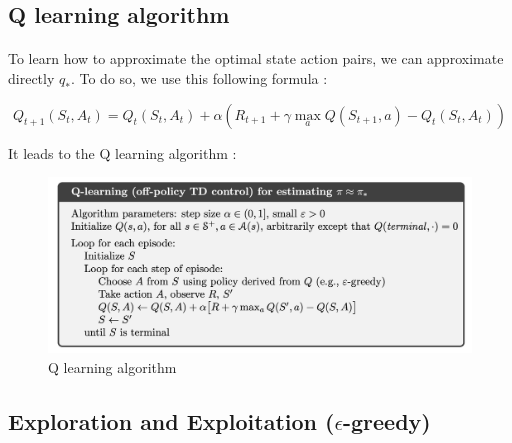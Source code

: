 \documentclass[a4paper]{article}
\begin{document}
\subsection{Q learning algorithm}
\paragraph{} To learn how to approximate the optimal state action pairs, we can approximate directly $q_{*}$. To do so, we use this following formula : 

\[   Q_{t+1}(S_t, A_t) =   Q_{t}(S_t, A_t) + \alpha (R_{t+1} + \gamma \max_{a} Q(S_{t+1} , a) - Q_{t}(S_t, A_t)        )            \]

It leads to the Q learning algorithm : 

\begin{figure}[h!]
\begin{center}
\includegraphics[width=1.2\linewidth]{img/qlearning.png}
\caption{Q learning algorithm}
\end{center}
\end{figure}

\newpage

\subsection{Exploration and Exploitation ($\epsilon$-greedy)}
\end{document}
